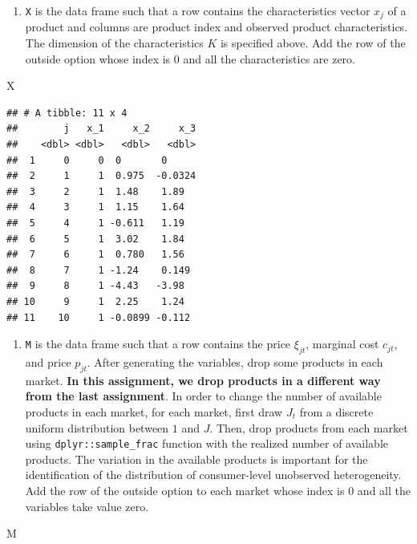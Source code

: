 \documentclass[
]{book}
\newenvironment{Shaded}{\begin{snugshade}}{\end{snugshade}}
\newcommand{\NormalTok}[1]{#1}
\providecommand{\tightlist}{%
  \setlength{\itemsep}{0pt}\setlength{\parskip}{0pt}}
\begin{document}
\begin{enumerate}
\def\labelenumi{\arabic{enumi}.}
\setcounter{enumi}{1}
\tightlist
\item
  \texttt{X} is the data frame such that a row contains the characteristics vector \(x_{j}\) of a product and columns are product index and observed product characteristics. The dimension of the characteristics \(K\) is specified above. Add the row of the outside option whose index is \(0\) and all the characteristics are zero.
\end{enumerate}

\begin{Shaded}
\begin{Highlighting}[]
\NormalTok{X}
\end{Highlighting}
\end{Shaded}

\begin{verbatim}
## # A tibble: 11 x 4
##        j   x_1     x_2     x_3
##    <dbl> <dbl>   <dbl>   <dbl>
##  1     0     0  0       0     
##  2     1     1  0.975  -0.0324
##  3     2     1  1.48    1.89  
##  4     3     1  1.15    1.64  
##  5     4     1 -0.611   1.19  
##  6     5     1  3.02    1.84  
##  7     6     1  0.780   1.56  
##  8     7     1 -1.24    0.149 
##  9     8     1 -4.43   -3.98  
## 10     9     1  2.25    1.24  
## 11    10     1 -0.0899 -0.112
\end{verbatim}

\begin{enumerate}
\def\labelenumi{\arabic{enumi}.}
\setcounter{enumi}{2}
\tightlist
\item
  \texttt{M} is the data frame such that a row contains the price \(\xi_{jt}\), marginal cost \(c_{jt}\), and price \(p_{jt}\). After generating the variables, drop some products in each market. \textbf{In this assignment, we drop products in a different way from the last assignment}. In order to change the number of available products in each market, for each market, first draw \(J_t\) from a discrete uniform distribution between \(1\) and \(J\). Then, drop products from each market using \texttt{dplyr::sample\_frac} function with the realized number of available products. The variation in the available products is important for the identification of the distribution of consumer-level unobserved heterogeneity. Add the row of the outside option to each market whose index is \(0\) and all the variables take value zero.
\end{enumerate}

\begin{Shaded}
\begin{Highlighting}[]
\NormalTok{M}
\end{Highlighting}
\end{Shaded}
\end{document}
